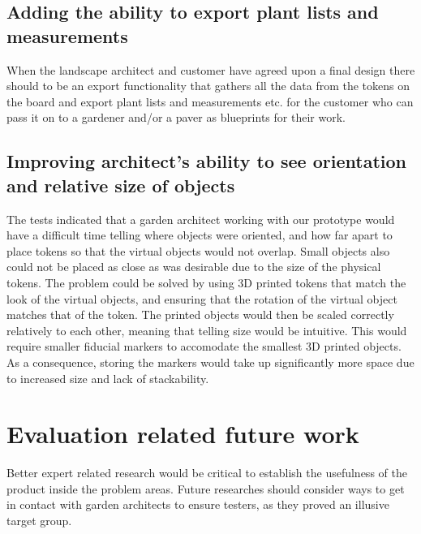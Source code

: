\subsection*{Adding the ability to export plant lists and measurements}
When the landscape architect and customer have agreed upon a final design there should to be an export functionality that gathers all the data from the tokens on the board and export plant lists and measurements etc. for the customer who can pass it on to a gardener and/or a paver as blueprints for their work.

\subsection*{Improving architect's ability to see orientation and relative size of objects}
The tests indicated that a garden architect working with our prototype would have a difficult time telling where objects were oriented, and how far apart to place tokens so that the virtual objects would not overlap. Small objects also could not be placed as close as was desirable due to the size of the physical tokens. The problem could be solved by using 3D printed tokens that match the look of the virtual objects, and ensuring that the rotation of the virtual object matches that of the token. The printed objects would then be scaled correctly relatively to each other, meaning that telling size would be intuitive. This would require smaller fiducial markers to accomodate the smallest 3D printed objects. As a consequence, storing the markers would take up significantly more space due to increased size and lack of stackability. 

\section{Evaluation related future work}

Better expert related research would be critical to establish the usefulness of the product inside the problem areas. Future researches should consider ways to get in contact with garden architects to ensure testers, as they proved an illusive target group.